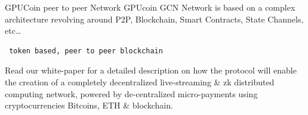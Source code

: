 \documentclass[10pt,handout]{beamer}
\newcommand{\themename}{\textbf{\textsc{metropolis}}\xspace}
\begin{document}
\begin{frame}[fragile]{GPUCoin peer to peer Network }
GPUcoin GCN Network is based on a complex architecture revolving around P2P, Blockchain, Smart Contracts, State Channels, etc\ldots
 \begin{verbatim} 
 token based, peer to peer blockchain 
 \end{verbatim}
 
 Read our white-paper for a detailed description on how the protocol will enable the creation of a completely decentralized live-streaming \& zk distributed computing network, powered by de-centralized micro-payments using cryptocurrencies Bitcoins, ETH \& blockchain. 


\end{frame}
\end{document}
